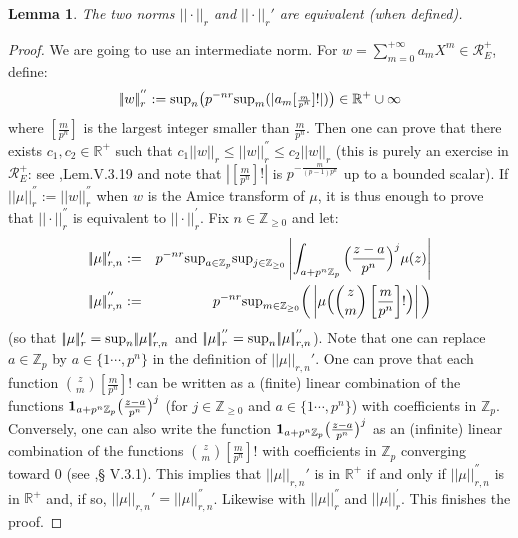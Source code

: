 \documentclass[11pt]{amsart}
\def\Z{{\mathbb Z}_p}
\newtheorem{lem}[definit]{\bf{Lemma}}
\begin{document}
\begin{lem}\label{normequiv} 
The two norms $|\!|\cdot|\!|_r$ and $|\!|\cdot|\!|_r'$ are equivalent (when defined). 
\end{lem} 
\begin{proof} 
We are going to use an intermediate norm. For
$w=\sum_{m=0}^{+\infty}a_mX^m\in {\mathcal R}_E^+$, define:  
$$|\!|w|\!|^{''}_r:={\rm sup}_n\big(p^{-nr}
{\rm sup}_m(|a_m[{\scriptstyle{\frac{m}{p^n}}}]!|)\big)\in {\mathbb R}^+\cup \infty$$ 
where $[\frac{m}{p^n}]$ is the largest integer smaller than
$\frac{m}{p^n}$. Then one can prove that there exists $c_1,c_2\in
{\mathbb R}^+$ such that $c_1|\!|w|\!|_r\leq |\!|w|\!|_r^{''}\leq
c_2|\!|w|\!|_r$ (this is purely an exercise in ${\mathcal R}_E^+$: see
\cite{Co2},Lem.V.3.19 and note that $|[\frac{m}{p^n}]!|$ is
$p^{-\frac{m}{(p-1)p^n}}$ up to a bounded scalar). If
$|\!|\mu|\!|^{''}_r:=|\!|w|\!|^{''}_r$ when $w$ is the Amice transform
of $\mu$, it is thus enough to prove that $|\!|\cdot|\!|^{''}_r$ is
equivalent to $|\!|\cdot|\!|^{'}_r$. Fix $n\in {\mathbb Z}_{\geq 0}$
and let:  
\begin{eqnarray*} 
|\!|\mu|\!|_{r,n}'&:=&p^{-nr}{\rm sup}_{a\in\Z}
{\rm sup}_{j\in{\mathbb Z}_{\geq
    0}}\left|\int_{a+p^n\Z}\Big(\frac{z-a}{p^n}\Big)^j\mu(z)\right|\\  
|\!|\mu|\!|_{r,n}^{''}&:=&p^{-nr}{\rm sup}_{m\in{\mathbb Z}_{\geq 0}}
\bigg(\left|\mu\Big({z\choose m}\left[{\frac{m}{p^n}}\right]!\Big)\right|\bigg) 
\end{eqnarray*}
(so that $|\!|\mu|\!|_{r}'={\rm sup}_n|\!|\mu|\!|_{r,n}'$ and
$|\!|\mu|\!|_{r}^{''}={\rm sup}_n|\!|\mu|\!|_{r,n}^{''}$). Note that
one can replace $a\in \Z$ by $a\in \{1\cdots,p^n\}$ in the definition
of $|\!|\mu|\!|_{r,n}'$. One can prove that each function ${z\choose
  m}[{\frac{m}{p^n}}]!$ can be written as a (finite) linear
combination of the functions ${\bf
  1}_{a+p^n\Z}\big(\frac{z-a}{p^n}\big)^j$ (for $j\in {\mathbb
  Z}_{\geq 0}$ and $a\in \{1\cdots,p^n\}$) with coefficients in
$\Z$. Conversely, one can also write the function ${\bf
  1}_{a+p^n\Z}\big(\frac{z-a}{p^n}\big)^j$ as an (infinite) linear
combination of the functions ${z\choose m}[{\frac{m}{p^n}}]!$ with
coefficients in $\Z$ converging toward $0$ (see \cite{Co2},\S
V.3.1). This implies that $|\!|\mu|\!|_{r,n}'$ is in ${\mathbb R}^+$
if and only if $|\!|\mu|\!|_{r,n}^{''}$ is in ${\mathbb R}^+$ and, if
so, $|\!|\mu|\!|_{r,n}'=|\!|\mu|\!|_{r,n}^{''}$. Likewise with
$|\!|\mu|\!|_{r}^{''}$ and $|\!|\mu|\!|_{r}^{'}$. This finishes the
proof.  
\end{proof} 
 
\end{document}
